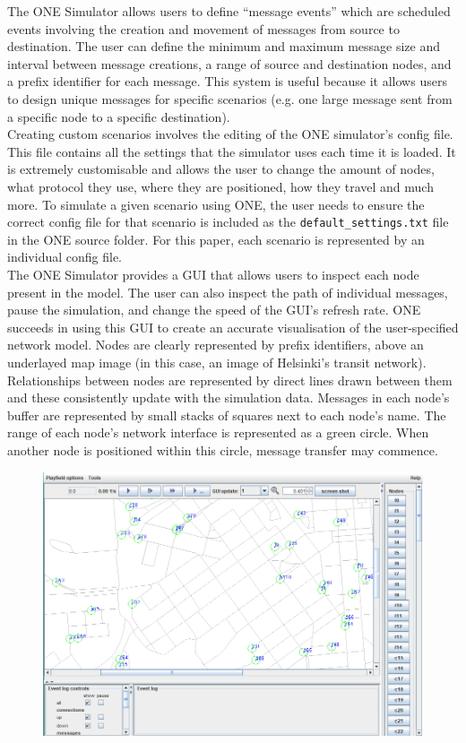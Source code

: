 \documentclass{article}
\begin{document}
\noindent The ONE Simulator allows users to define ``message events'' which are scheduled events involving the creation and movement of messages from source to destination. The user can define the minimum and maximum message size and interval between message creations, a range of source and destination nodes, and a prefix identifier for each message. This system is useful because it allows users to design unique messages for specific scenarios (e.g. one large message sent from a specific node to a specific destination).\\
\newline Creating custom scenarios involves the editing of the ONE simulator's config file. This file contains all the settings that the simulator uses each time it is loaded. It is extremely customisable and allows the user to change the amount of nodes, what protocol they use, where they are positioned, how they travel and much more. To simulate a given scenario using ONE, the user needs to ensure the correct config file for that scenario is included as the \texttt{default\_settings.txt} file in the ONE source folder. For this paper, each scenario is represented by an individual config file.\\
\newline The ONE Simulator provides a GUI that allows users to inspect each node present in the model. The user can also inspect the path of individual messages, pause the simulation, and change the speed of the GUI's refresh rate. ONE succeeds in using this GUI to create an accurate visualisation of the user-specified network model. Nodes are clearly represented by prefix identifiers, above an underlayed map image (in this case, an image of Helsinki's transit network). Relationships between nodes are represented by direct lines drawn between them and these consistently update with the simulation data. Messages in each node's buffer are represented by small stacks of squares next to each node's name. The range of each node's network interface is represented as a green circle. When another node is positioned within this circle, message transfer may commence.\\

\begin{figure}[h!]
\captionsetup{justification=centering, font=footnotesize}
\centering
  \includegraphics[width=.75\linewidth]{Screenshots/ONEGUI.png}
  \label{fig:test1}
\end{figure}
\end{document}
